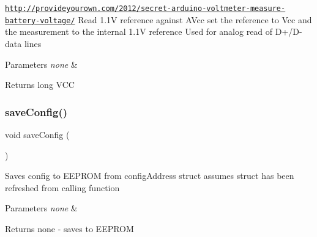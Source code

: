 \href{http://provideyourown.com/2012/secret-arduino-voltmeter-measure-battery-voltage/}{\tt http\+://provideyourown.\+com/2012/secret-\/arduino-\/voltmeter-\/measure-\/battery-\/voltage/} Read 1.\+1V reference against A\+Vcc set the reference to Vcc and the measurement to the internal 1.\+1V reference Used for analog read of D+/\+D-\/ data lines


\begin{DoxyParams}{Parameters}
{\em none} & \\
\hline
\end{DoxyParams}
\begin{DoxyReturn}{Returns}
long V\+CC 
\end{DoxyReturn}
\hypertarget{_u_s_b___tester___o_l_e_d__128x64___beta__2_82_8ino_a688d00bbabd28fbaf9e0c50eca3adeae}{}\label{_u_s_b___tester___o_l_e_d__128x64___beta__2_82_8ino_a688d00bbabd28fbaf9e0c50eca3adeae} 
\subsubsection{\texorpdfstring{save\+Config()}{saveConfig()}}
{\footnotesize\ttfamily void save\+Config (\begin{DoxyParamCaption}{ }\end{DoxyParamCaption})}

Saves config to E\+E\+P\+R\+OM from config\+Address struct assumes struct has been refreshed from calling function


\begin{DoxyParams}{Parameters}
{\em none} & \\
\hline
\end{DoxyParams}
\begin{DoxyReturn}{Returns}
none -\/ saves to E\+E\+P\+R\+OM 
\end{DoxyReturn}
\hypertarget{_u_s_b___tester___o_l_e_d__128x64___beta__2_82_8ino_aca4b07e408986e89a8c9a07a64e072b6}{}\label{_u_s_b___tester___o_l_e_d__128x64___beta__2_82_8ino_aca4b07e408986e89a8c9a07a64e072b6} 
